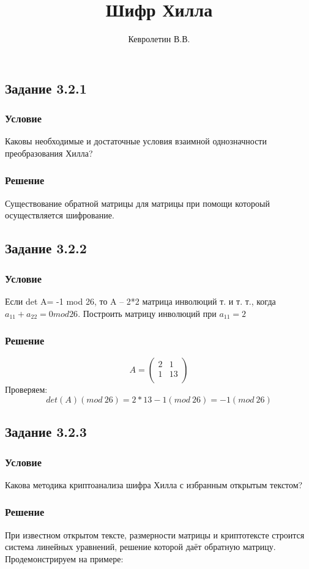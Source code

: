 \documentclass[10pt,a4paper]{article}
\author{Кевролетин В.В.}
\title{Шифр Хилла}
\begin{document}
\maketitle

\subsection*{Задание 3.2.1}
\subsubsection*{Условие}
Каковы необходимые и достаточные условия взаимной однозначности
преобразования Хилла?
\subsubsection*{Решение}
Существование обратной матрицы для матрицы при помощи котороый
осуществляется шифрование.

\subsection*{Задание 3.2.2}
\subsubsection*{Условие}
Если det A= -1 mod 26, то A -- 2*2 матрица инволюций т. и т. т., когда
$a_{11} + a_{22}=0 mod 26$. Построить матрицу инволюций при $a_{11}=2$
\subsubsection*{Решение}
$$A = \begin{pmatrix}
2 & 1 \\
1 & 13 \\        
\end{pmatrix}$$
Проверяем:
$$ det(A) (mod\ 26) = 2*13 - 1 (mod\ 26) = -1(mod\ 26)$$


\subsection*{Задание 3.2.3}
\subsubsection*{Условие}
Какова методика криптоанализа шифра Хилла с избранным открытым
текстом?
\subsubsection*{Решение}
При известном открытом тексте, размерности матрицы и криптотексте
строится система линейных уравнений, решение которой даёт обратную
матрицу. Продемонстрируем на примере:
\end{document}
